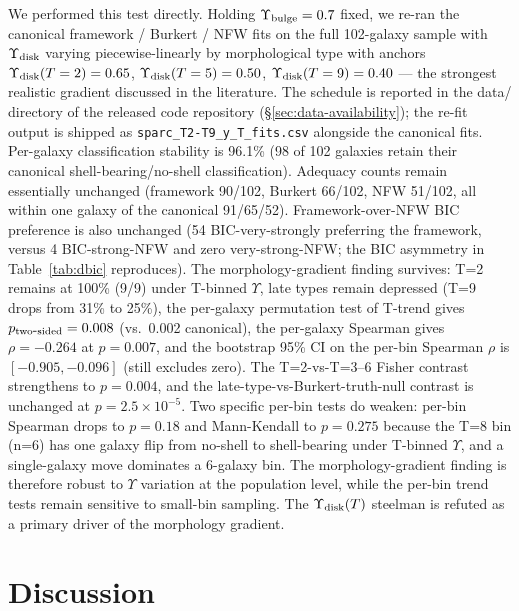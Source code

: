 We performed this test directly. Holding $\Upsilon_{\rm bulge} = 0.7$ fixed, we re-ran the canonical framework / Burkert / NFW fits on the full 102-galaxy sample with $\Upsilon_{\rm disk}$ varying piecewise-linearly by morphological type with anchors $\Upsilon_{\rm disk}(T=2) = 0.65$, $\Upsilon_{\rm disk}(T=5) = 0.50$, $\Upsilon_{\rm disk}(T=9) = 0.40$ \citep{Schombert2022} --- the strongest realistic gradient discussed in the literature. The schedule is reported in the data/ directory of the released code repository (\S\ref{sec:data-availability}); the re-fit output is shipped as \texttt{sparc\_T2-T9\_y\_T\_fits.csv} alongside the canonical fits. Per-galaxy classification stability is 96.1\% (98 of 102 galaxies retain their canonical shell-bearing/no-shell classification). Adequacy counts remain essentially unchanged (framework 90/102, Burkert 66/102, NFW 51/102, all within one galaxy of the canonical 91/65/52). Framework-over-NFW BIC preference is also unchanged (54 BIC-very-strongly preferring the framework, versus 4 BIC-strong-NFW and zero very-strong-NFW; the BIC asymmetry in Table~\ref{tab:dbic} reproduces). The morphology-gradient finding survives: T=2 remains at 100\% (9/9) under T-binned $\Upsilon$, late types remain depressed (T=9 drops from 31\% to 25\%), the per-galaxy permutation test of T-trend gives $p_{\rm two\mbox{-}sided} = 0.008$ (vs.\ 0.002 canonical), the per-galaxy Spearman gives $\rho = -0.264$ at $p = 0.007$, and the bootstrap 95\% CI on the per-bin Spearman $\rho$ is $[-0.905, -0.096]$ (still excludes zero). The T=2-vs-T=3--6 Fisher contrast strengthens to $p = 0.004$, and the late-type-vs-Burkert-truth-null contrast is unchanged at $p = 2.5 \times 10^{-5}$. Two specific per-bin tests do weaken: per-bin Spearman drops to $p = 0.18$ and Mann-Kendall to $p = 0.275$ because the T=8 bin (n=6) has one galaxy flip from no-shell to shell-bearing under T-binned $\Upsilon$, and a single-galaxy move dominates a 6-galaxy bin. The morphology-gradient finding is therefore robust to $\Upsilon$ variation at the population level, while the per-bin trend tests remain sensitive to small-bin sampling. The $\Upsilon_{\rm disk}(T)$ steelman is refuted as a primary driver of the morphology gradient.

\section{Discussion}
\label{sec:discussion}

